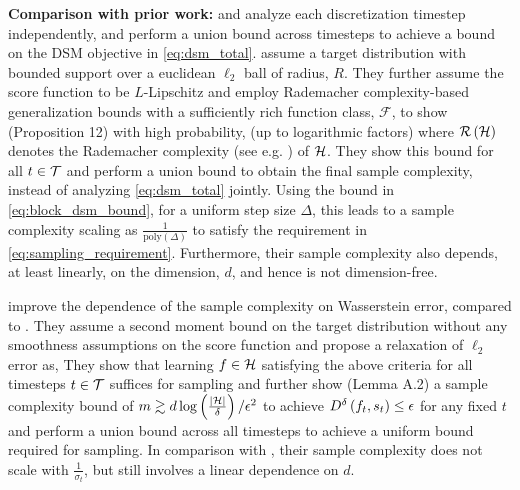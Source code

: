 \textbf{Comparison with prior work:}
\cite{block2020generative} and \cite{gupta2023sample} analyze each discretization timestep independently, and perform a union bound across timesteps to achieve a bound on the DSM objective in \eqref{eq:dsm_total}. \cite{block2020generative} assume a target distribution with bounded support over a euclidean $\ell_{2}$ ball of radius, $R$. They further assume the score function to be $L$-Lipschitz and employ Rademacher complexity-based generalization bounds with a sufficiently rich function class, $\mathcal{F}$, to show (Proposition 12) with high probability, (up to logarithmic factors) 
where $\mathcal{R}\left(\mathcal{H}\right)$ denotes the Rademacher complexity (see e.g. \cite{bartlett2002rademacher}) of $\mathcal{H}$. They show this bound for all $t \in \mathcal{T}$ and perform a union bound to obtain the final sample complexity, instead of analyzing \eqref{eq:dsm_total} jointly. 
Using the bound in \eqref{eq:block_dsm_bound}, for a uniform step size $\Delta$, this leads to a sample complexity scaling as $\frac{1}{\text{poly}(\Delta)}$ to satisfy the requirement in \eqref{eq:sampling_requirement}. Furthermore, their sample complexity also depends, at least linearly, on the dimension, $d$, and hence is not dimension-free.

\cite{gupta2023sample} improve the dependence of the sample complexity on Wasserstein error, compared to \cite{block2020generative}. They assume a second moment bound on the target distribution without any smoothness assumptions on the score function and propose a relaxation of $\ell_{2}$ error as, 
They show that learning $f \in \mathcal{H}$ satisfying the above criteria for all timesteps $t \in \mathcal{T}$ suffices for sampling and further show (Lemma A.2) a sample complexity bound of $m \gtrsim d\log\left(\frac{|\mathcal{H}|}{\delta}\right)/\epsilon^{2}$ to achieve $D^{\delta}\left(f_t, s_t\right) \leq \epsilon$ for any fixed $t$ and  perform a union bound across all timesteps to achieve a uniform bound required for sampling. In comparison with \cite{block2020generative}, their sample complexity does not scale with $\frac{1}{\sigma_t}$, but still involves a linear dependence on $d$.

